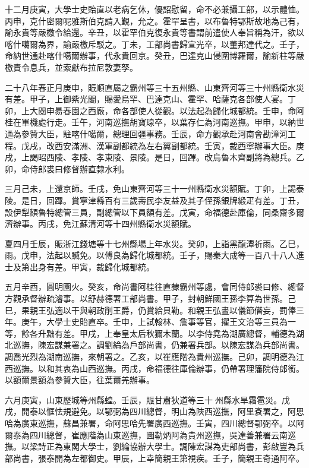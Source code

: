 \begin{pinyinscope}
十二月庚寅，大學士史貽直以老病乞休，優詔慰留，命不必兼攝工部，以示體恤。丙申，克什密爾呢雅斯伯克請入覲，允之。霍罕呈書，以布魯特鄂斯故地為己有，諭永貴等嚴檄令給還。辛丑，以霍罕伯克復永貴等書謂前遣使人奉旨稱為汗，欲以喀什噶爾為界，諭嚴檄斥駁之。丁未，工部尚書歸宣光卒，以董邦達代之。壬子，命納世通赴喀什噶爾辦事，代永貴回京。癸丑，巴達克山侵圍博羅爾，諭新柱等嚴檄責令息兵，並索獻布拉尼敦妻孥。

二十八年春正月庚申，賑順直屬之霸州等三十五州縣、山東齊河等三十州縣衛水災有差。甲子，上御紫光閣，賜愛烏罕、巴達克山、霍罕、哈薩克各部使人宴。丁卯，上大閱申昜春園之西廠，命各部使人從觀。以法起為歸化城都統。壬申，命阿桂在軍機處行走。壬午，河南巡撫胡寶瑔卒，以葉存仁為河南巡撫。甲申，以納世通為參贊大臣，駐喀什噶爾，總理回疆事務。壬辰，命方觀承赴河南會勘漳河工程。戊戌，改西安滿洲、漢軍副都統為左右翼副都統。壬寅，裁西寧辦事大臣。庚戌，上謁昭西陵、孝陵、孝東陵、景陵。是日，回蹕。改烏魯木齊副將為總兵。乙卯，命侍郎裘曰修督辦直隸水利。

三月己未，上還京師。壬戌，免山東齊河等三十一州縣衛水災額賦。丁卯，上謁泰陵。是日，回蹕。賞寧津縣百有三歲壽民李友益及其子侄孫銀牌緞疋有差。丁丑，設伊犁額魯特總管三員，副總管以下員額有差。戊寅，命福德赴庫倫，同桑齋多爾濟辦事。丙戌，免江蘇清河等十四州縣衛水災額賦。

夏四月壬辰，賑浙江錢塘等十七州縣場上年水災。癸卯，上詣黑龍潭祈雨。乙巳，雨。戊申，法起以贓免。以傅良為歸化城都統。壬子，賜秦大成等一百八十八人進士及第出身有差。甲寅，裁歸化城都統。

五月辛酉，圓明園火。癸亥，命尚書阿桂往直隸霸州等處，會同侍郎裘曰修、總督方觀承督辦疏濬事。以舒赫德署工部尚書。甲子，封朝鮮國王孫李算為世孫。己巳，果親王弘適以干與朝政削王爵，仍賞給貝勒。和親王弘晝以儀節僭妄，罰俸三年。庚午，大學士史貽直卒。壬申，上試翰林、詹事等官，擢王文治等三員為一等，餘各升黜有差。甲戌，上奉皇太后秋獮木蘭。以李侍堯為湖廣總督，輔德為湖北巡撫，陳宏謀兼署之。調劉綸為戶部尚書，仍兼署兵部。以陳宏謀為兵部尚書。調喬光烈為湖南巡撫，來朝署之。乙亥，以崔應階為貴州巡撫。己卯，調明德為江西巡撫。以和其衷為山西巡撫。丙戌，命福德往庫倫辦事，仍帶署理籓院侍郎銜。以額爾景額為參贊大臣，往葉爾羌辦事。

六月庚寅，山東歷城等州縣蝗。壬辰，賑甘肅狄道等三十州縣水旱霜雹災。戊戌，開泰以恇怯規避免。以鄂弼為四川總督，明山為陜西巡撫，阿里袞署之，阿思哈為廣東巡撫，蘇昌兼署，命阿思哈先署廣西巡撫。壬寅，四川總督鄂弼卒。以阿爾泰為四川總督，崔應階為山東巡撫，圖勒炳阿為貴州巡撫，吳達善兼署云南巡撫。以梁詩正為東閣大學士，劉綸協辦大學士。調陳宏謀為吏部尚書，彭啟豐為兵部尚書，張泰開為左都御史。甲辰，上幸簡親王第視疾。壬子，簡親王奇通阿卒。


\end{pinyinscope}
